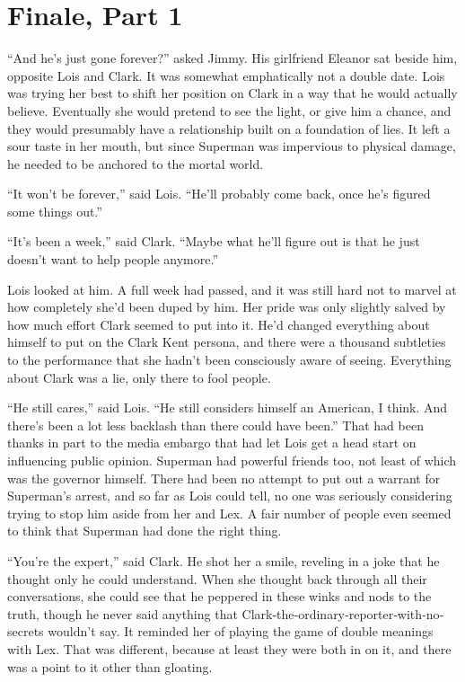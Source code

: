 \chapter{Finale, Part 1}\label{finale-part-1}

``And he's just gone forever?'' asked Jimmy. His girlfriend Eleanor sat
beside him, opposite Lois and Clark. It was somewhat emphatically not a
double date. Lois was trying her best to shift her position on Clark in
a way that he would actually believe. Eventually she would pretend to
see the light, or give him a chance, and they would presumably have a
relationship built on a foundation of lies. It left a sour taste in her
mouth, but since Superman was impervious to physical damage, he needed
to be anchored to the mortal world.

``It won't be forever,'' said Lois. ``He'll probably come back, once
he's figured some things out.''

``It's been a week,'' said Clark. ``Maybe what he'll figure out is that
he just doesn't want to help people anymore.''

Lois looked at him. A full week had passed, and it was still hard not to
marvel at how completely she'd been duped by him. Her pride was only
slightly salved by how much effort Clark seemed to put into it. He'd
changed everything about himself to put on the Clark Kent persona, and
there were a thousand subtleties to the performance that she hadn't been
consciously aware of seeing. Everything about Clark was a lie, only
there to fool people.

``He still cares,'' said Lois. ``He still considers himself an American,
I think. And there's been a lot less backlash than there could have
been.'' That had been thanks in part to the media embargo that had let
Lois get a head start on influencing public opinion. Superman had
powerful friends too, not least of which was the governor himself. There
had been no attempt to put out a warrant for Superman's arrest, and so
far as Lois could tell, no one was seriously considering trying to stop
him aside from her and Lex. A fair number of people even seemed to think
that Superman had done the right thing.

``You're the expert,'' said Clark. He shot her a smile, reveling in a
joke that he thought only he could understand. When she thought back
through all their conversations, she could see that he peppered in these
winks and nods to the truth, though he never said anything that
Clark‐the‐ordinary‐reporter‐with‐no‐secrets wouldn't say. It reminded
her of playing the game of double meanings with Lex. That was different,
because at least they were both in on it, and there was a point to it
other than gloating.

